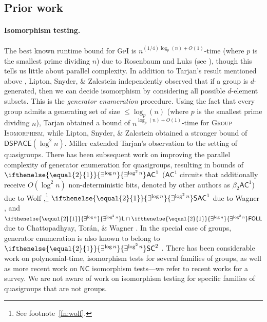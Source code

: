 \documentclass{theoretics}
\newcommand{\algprobm}[1]{\textsc{#1}\xspace}
\newcommand{\betacc}[1]{\ifthenelse{\equal{#1}{1}}{\exists^{\log n}}{\exists^{\log^{#1}n}}} %
\newcommand*{\ComplexityClass}[1]{\ensuremath{\mathsf{#1}}\xspace}
\newcommand*{\LogSpace}{\ComplexityClass{L}}
\newcommand{\AC}{\ComplexityClass{AC}}
\newcommand{\SAC}{\ComplexityClass{SAC}}
\newcommand{\FOLL}{\ComplexityClass{FOLL}}
\begin{document}
\subsection{Prior work}
\paragraph{Isomorphism testing.} The best known runtime bound for \algprobm{GpI} is $n^{(1/4) \log_{p}(n) + O(1)}$-time (where $p$ is the smallest prime dividing $n$) due to Rosenbaum \cite{Rosenbaum2013BidirectionalCD} and Luks \cite{LuksCompositionSeriesIso} (see \cite[Sec. 2.2]{GR16}), though this tells us little about parallel complexity. In addition to Tarjan's result mentioned above \cite{MillerTarjan}, Lipton, Snyder, \& Zalcstein \cite{LiptonSnyderZalcstein} independently observed that if a group is $d$-generated, then we can decide isomorphism by considering all possible $d$-element subsets. This is the \textit{generator enumeration} procedure. Using the fact that  every group admits a generating set of size $\leq \log_{p}(n)$ (where $p$ is the smallest prime dividing $n$), Tarjan obtained a bound of $n^{\log_{p}(n) + O(1)}$-time for \algprobm{Group Isomorphism}, while Lipton, Snyder, \& Zalcstein \cite{LiptonSnyderZalcstein} obtained a stronger bound of $\mathsf{DSPACE}(\log^{2} n)$. Miller \cite{MillerTarjan} extended Tarjan's observation to the setting of quasigroups. There has been subsequent work on improving the parallel complexity of generator enumeration for quasigroups, resulting in bounds of $\betacc{2}\AC^{1}$ ($\AC^{1}$ circuits that additionally receive $O(\log^{2} n)$ non-deterministic bits, denoted by other authors as $\beta_{2}\AC^1$) due to Wolf
\cite{Wolf},\footnote{See footnote~\ref{fn:wolf}.} $\betacc{2}\SAC^{1}$ due to Wagner \cite{WagnerThesis}, and $\betacc{2}\LogSpace \cap \betacc{2}\FOLL$ due to Chattopadhyay, Tor\'an, \& Wagner \cite{ChattopadhyayToranWagner}. In the special case of groups, generator enumeration is also known to belong to $\betacc{2}\mathsf{SC}^{2}$ \cite{TangThesis}. There has been considerable work on polynomial-time, isomorphism tests for several families of groups, as well as more recent work on $\mathsf{NC}$ isomorphism tests---we refer to recent works \cite{GQcoho, DietrichWilson, GrochowLevetWL} for a survey. We are not aware of work on isomorphism testing for specific families of quasigroups that are not groups.
\end{document}
